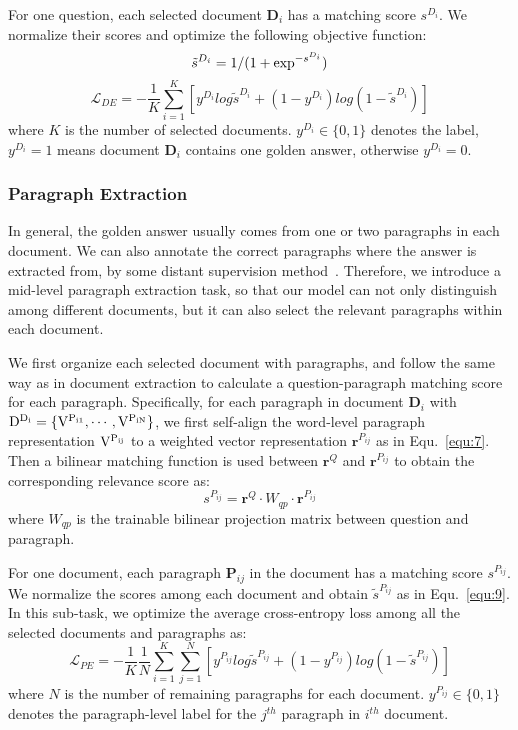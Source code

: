 \documentclass[letterpaper]{article} \usepackage{aaai19}  \usepackage{graphicx}
\begin{document}
For one question, each selected document $\textbf{D}_i$ has a matching score $s^{D_i}$. We normalize their scores and optimize the following objective function:
\begin{equation} \label{equ:9}
\tilde{s}^{D_i}=1/(1+{\rm exp}^{-s^{D_i}})
\end{equation}\vspace{-2mm}
\begin{equation} \label{equ:9_2}
\mathcal{L}_{DE}=-\frac{1}{K}\sum_{i=1}^{K}[y^{D_i}log\tilde{s}^{D_i}+(1-y^{D_i})log(1-\tilde{s}^{D_i})]
\end{equation}
where $K$ is the number of selected documents. $y^{D_i} \in \{0,1\}$ denotes the label, $y^{D_i}=1$ means document $\textbf{D}_i$ contains one golden answer, otherwise $y^{D_i}=0$.

\subsubsection{Paragraph Extraction}
In general, the golden answer usually comes from one or two paragraphs in each document. We can also annotate the correct paragraphs where the answer is extracted from, by some distant supervision method~\cite{chen2017reading}. Therefore, we introduce a mid-level paragraph extraction task, so that our model can not only distinguish among different documents, but it can also select the relevant paragraphs within each document.  

We first organize each selected document with paragraphs, and follow the same way as in document extraction to calculate a question-paragraph matching score for each paragraph. 
Specifically, for each paragraph in document $\textbf{D}_i$ with $\rm{D}^{D_i}=\{V^{P_{i1}}, \cdots ,V^{P_{iN}}\}$, we first self-align the word-level paragraph representation $\rm V^{P_{ij}}$ to a weighted vector representation $\textbf{r}^{P_{ij}}$ as in Equ.~\ref{equ:7}. Then a bilinear matching function is used between $\textbf{r}^Q$ and $\textbf{r}^{P_{ij}}$ to obtain the corresponding relevance score as:
\begin{equation} \label{equ:10}
s^{P_{ij}}={\textbf{r}^Q}\cdot W_{qp}\cdot \textbf{r}^{P_{ij}}
\end{equation}
where $W_{qp}$ is the trainable bilinear projection matrix between question and paragraph.

For one document, each paragraph $\textbf{P}_{ij}$ in the document has a matching score $s^{P_{ij}}$. We normalize the scores among each document and obtain $\tilde{s}^{P_{ij}}$ as in Equ.~\ref{equ:9}. In this sub-task, we optimize the average cross-entropy loss among all the selected documents and paragraphs as:
\begin{equation} \label{equ:11}
\mathcal{L}_{PE}=-\frac{1}{K}\frac{1}{N}\sum_{i=1}^{K}\sum_{j=1}^{N}[y^{P_{ij}}log\tilde{s}^{P_{ij}}+(1-y^{P_{ij}})log(1-\tilde{s}^{P_{ij}})]
\end{equation}
where $N$ is the number of remaining paragraphs for each document. $y^{P_{ij}} \in \{0,1\}$ denotes the paragraph-level label for the $j^{th}$ paragraph in $i^{th}$ document. 
\end{document}
